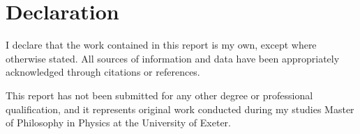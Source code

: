 \section*{Declaration}

I declare that the work contained in this report is my own, except where otherwise stated. All sources of information and data have been appropriately acknowledged through citations or references.

This report has not been submitted for any other degree or professional qualification, and it represents original work conducted during my studies Master of Philosophy in Physics at the University of Exeter.